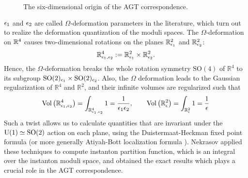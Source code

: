 \begin{figure}
  \centering
    \def\height{1.2cm}
  \caption{The six-dimensional origin of the AGT correspondence.}
  \label{fig:AGT}
\end{figure}




$\epsilon_1$ and $\epsilon_2$ are
called $\Omega$-deformation parameters in the literature, which turn out
to realize the deformation quantization of the moduli spaces.
The $\Omega$-deformation on $\mathbb{R}^4$ causes
two-dimensional rotations on the planes $\mathbb R^2_{\epsilon_1}$ and $\mathbb R^2_{\epsilon_2}$:
\begin{equation}
    \mathbb{R}^4_{\epsilon_1,\epsilon_2} := \mathbb{R}^2_{\epsilon_1} \times \mathbb{R}^2_{\epsilon_2}.
\end{equation}
Hence, the $\Omega$-deformation breaks the whole rotation symmetry $\mathrm{SO}(4)$ of $\mathbb R^4$ to
its subgroup $\mathrm{SO}(2)_{\epsilon_1}\times\mathrm{SO}(2)_{\epsilon_2}$.
Also, the $\Omega$ deformation leads to the Gaussian regularization of $\mathbb R^4$ and $\mathbb R^2$,
and their infinite volumes are regularized such that
\begin{equation}
    \rm{Vol}\left(  \mathbb{R}^4_{\epsilon_1,\epsilon_2}  \right) = \int_{\mathbb{R}^4_{\epsilon_1,\epsilon_2}}1 = \frac{1}{\epsilon_1 \epsilon_2} ,
    \qquad
    \rm{Vol}\left(  \mathbb{R}^2_{\epsilon}  \right) = \int_{\mathbb{R}^2_{\epsilon}}1 = \frac{1}{\epsilon}
\end{equation}
Such a twist allows us to calculate quantities that are invariant under the $\mathrm{U}(1) \simeq \mathrm{SO}(2)$
action on each plane, using the Duistermaat-Heckman fixed point formula
\cite{Duistermaat:1982vw} (or more generally Atiyah-Bott localization formula \cite{Atiyah:1984px}).
Nekrasov applied these techniques to compute instanton partition function, which is an integral over
the instanton moduli space, and obtained the exact results \cite{Nekrasov:2002qd,Nekrasov:2003rj}
which plays a crucial role in the AGT correspondence.


